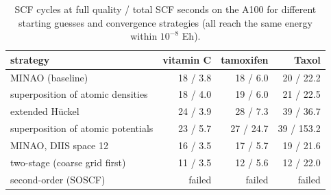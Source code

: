 \begin{table}[!htbp]
\centering
\small
\begin{tabular}{lrrr}
\toprule
strategy & vitamin C & tamoxifen & Taxol \\
\midrule
MINAO (baseline) & 18 / 3.8 & 18 / 6.0 & 20 / 22.2 \\
superposition of atomic densities & 18 / 4.0 & 19 / 6.0 & 21 / 22.5 \\
extended H\"uckel & 24 / 3.9 & 28 / 7.3 & 39 / 36.7 \\
superposition of atomic potentials & 23 / 5.7 & 27 / 24.7 & 39 / 153.2 \\
MINAO, DIIS space 12 & 16 / 3.5 & 17 / 5.7 & 19 / 21.6 \\
two-stage (coarse grid first) & 11 / 3.5 & 12 / 5.6 & 12 / 22.0 \\
second-order (SOSCF) & failed & failed & failed \\
\bottomrule
\end{tabular}
\caption{SCF cycles at full quality / total SCF seconds on the A100 for different starting guesses and convergence strategies (all reach the same energy within $10^{-8}$ Eh).}
\label{tab:cycles}
\end{table}
